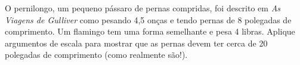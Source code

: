 O pernilongo, um pequeno pássaro de pernas compridas, foi descrito em \textit{As Viagens de Gulliver} como pesando 4,5 onças e tendo pernas de 8 polegadas de comprimento. Um flamingo tem uma forma semelhante e pesa 4 libras. Aplique argumentos de escala para mostrar que as pernas devem ter cerca de 20 polegadas de comprimento (como realmente são!).

